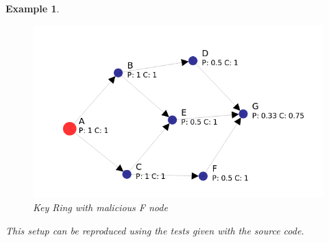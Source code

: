 \documentclass[]{article}
\newtheorem{exmp}{Example}[section]
\begin{document}
\begin{exmp}
	\begin{figure}[h]
		\includegraphics[width=\textwidth,height=\textheight,keepaspectratio]{keyring-bad1}
		\centering
		\caption{Key Ring with malicious F node}
		\label{fig:keyring_bad1}
	\end{figure}

	This setup can be reproduced using the tests given with the source code.

\end{exmp}




{}

\end{document}
